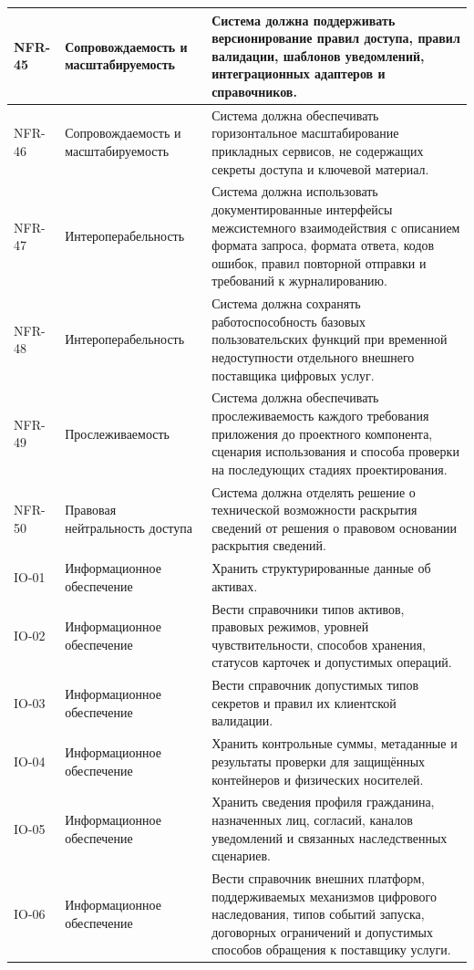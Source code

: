 \begin{longtable}{|P{1.45cm}|P{3.35cm}|P{10.7cm}|}
NFR-45 & Сопровождаемость и масштабируемость & Система должна поддерживать версионирование правил доступа, правил валидации, шаблонов уведомлений, интеграционных адаптеров и справочников.\\ \hline
NFR-46 & Сопровождаемость и масштабируемость & Система должна обеспечивать горизонтальное масштабирование прикладных сервисов, не содержащих секреты доступа и ключевой материал.\\ \hline
NFR-47 & Интер\-операбельность & Система должна использовать документированные интерфейсы межсистемного взаимодействия с описанием формата запроса, формата ответа, кодов ошибок, правил повторной отправки и требований к журналированию.\\ \hline
NFR-48 & Интер\-операбельность & Система должна сохранять работоспособность базовых пользовательских функций при временной недоступности отдельного внешнего поставщика цифровых услуг.\\ \hline
NFR-49 & Прослеживаемость & Система должна обеспечивать прослеживаемость каждого требования приложения до проектного компонента, сценария использования и способа проверки на последующих стадиях проектирования.\\ \hline
NFR-50 & Правовая нейтральность доступа & Система должна отделять решение о технической возможности раскрытия сведений от решения о правовом основании раскрытия сведений.\\ \hline
IO-01 & Информационное обеспечение & Хранить структурированные данные об активах.\\ \hline
IO-02 & Информационное обеспечение & Вести справочники типов активов, правовых режимов, уровней чувствительности, способов хранения, статусов карточек и допустимых операций.\\ \hline
IO-03 & Информационное обеспечение & Вести справочник допустимых типов секретов и правил их клиентской валидации.\\ \hline
IO-04 & Информационное обеспечение & Хранить контрольные суммы, метаданные и результаты проверки для защищённых контейнеров и физических носителей.\\ \hline
IO-05 & Информационное обеспечение & Хранить сведения профиля гражданина, назначенных лиц, согласий, каналов уведомлений и связанных наследственных сценариев.\\ \hline
IO-06 & Информационное обеспечение & Вести справочник внешних платформ, поддерживаемых механизмов цифрового наследования, типов событий запуска, договорных ограничений и допустимых способов обращения к поставщику услуги.\\ \hline

\end{longtable}
